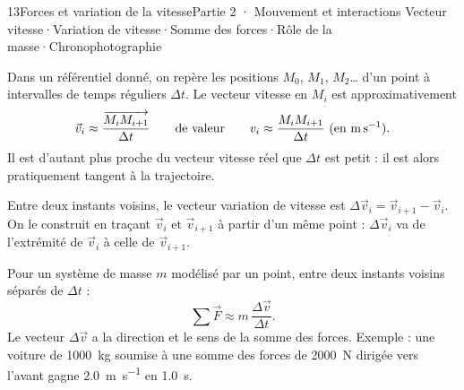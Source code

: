 \begin{ouverture}[mouvement]{13}{Forces et variation de la vitesse}{Partie 2 · Mouvement et interactions}
{Vecteur vitesse\enspace·\enspace Variation de vitesse\enspace·\enspace Somme des forces\enspace·\enspace Rôle de la masse\enspace·\enspace Chronophotographie}
\end{ouverture}
\essentiel
{}
\begin{definition}
Dans un référentiel donné, on repère les positions $M_0$, $M_1$, $M_2$… d'un point à intervalles de temps réguliers $\Delta t$. Le vecteur
vitesse en $M_i$ est approximativement
\[\vec{v}_i\approx\frac{\overrightarrow{M_iM_{i+1}}}{\Delta t}\qquad\text{de valeur}\qquad v_i\approx\frac{M_iM_{i+1}}{\Delta t}\ \text{(en \unit{m.s^{-1}})}.\]
Il est d'autant plus proche du vecteur vitesse réel que $\Delta t$ est petit : il est alors pratiquement tangent à la trajectoire.
\end{definition}
\begin{definition}
Entre deux instants voisins, le vecteur variation de vitesse est $\Delta\vec{v}_i=\vec{v}_{i+1}-\vec{v}_i$. On le construit en traçant $\vec{v}_i$ et
$\vec{v}_{i+1}$ à partir d'un même point : $\Delta\vec{v}_i$ va de l'extrémité de $\vec{v}_i$ à celle de $\vec{v}_{i+1}$.
\end{definition}
\begin{loi}
Pour un système de masse $m$ modélisé par un point, entre deux instants voisins séparés de $\Delta t$ :
\[\sum\vec{F}\approx m\,\frac{\Delta\vec{v}}{\Delta t}.\]
Le vecteur $\Delta\vec{v}$ a la direction et le sens de la somme des forces. Exemple : une voiture de \qty{1000}{kg} soumise à une somme des
forces de \qty{2000}{N} dirigée vers l'avant gagne \qty{2,0}{m.s^{-1}} en \qty{1,0}{s}.
\end{loi}
